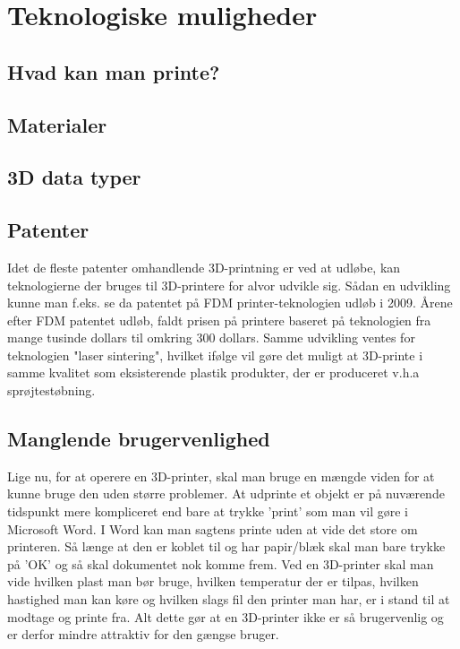 \section{Teknologiske muligheder} %

\subsection{Hvad kan man printe?} %


\subsection{Materialer} %
\label{sub:materialer}


\subsection{3D data typer}




\subsection{Patenter} %
\label{sub:patenter}

Idet de fleste patenter omhandlende 3D-printning er ved at udløbe, kan teknologierne der bruges til 3D-printere for alvor udvikle sig. Sådan en udvikling kunne man f.eks. se da patentet på FDM printer-teknologien udløb i 2009. \autocite{manyika_disruptive_2013} Årene efter FDM patentet udløb, faldt prisen på printere baseret på teknologien fra mange tusinde dollars til omkring 300 dollars. \autocite{mims_3d_2013} Samme udvikling ventes for teknologien "laser sintering", hvilket ifølge \autocite{mims_3d_2013} vil gøre det muligt at 3D-printe i samme kvalitet som eksisterende plastik produkter, der er produceret v.h.a sprøjtestøbning.


\subsection{Manglende brugervenlighed} %
\label{sub:manglende_brugervenlighed}

Lige nu, for at operere en 3D-printer, skal man bruge en mængde viden for at kunne bruge den uden større problemer. At udprinte et objekt er på nuværende tidspunkt mere kompliceret end bare at trykke ’print’ som man vil gøre i Microsoft Word. I Word kan man sagtens printe uden at vide det store om printeren. Så længe at den er koblet til og har papir/blæk skal man bare trykke på ’OK’ og så skal dokumentet nok komme frem. 
Ved en 3D-printer skal man vide hvilken plast man bør bruge, hvilken temperatur der er tilpas, hvilken hastighed man kan køre og hvilken slags fil den printer man har, er i stand til at modtage og printe fra.
Alt dette gør at en 3D-printer ikke er så brugervenlig og er derfor mindre attraktiv for den gængse bruger.




